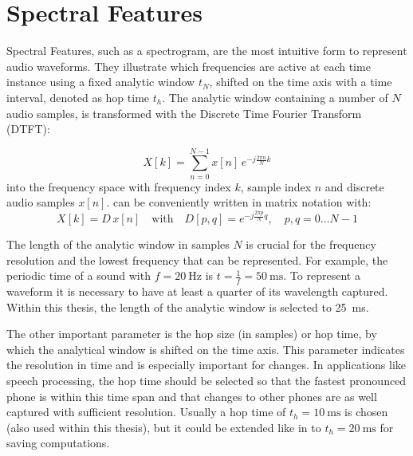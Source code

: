 
\section{Spectral Features}\label{sec:signal_spec}
Spectral Features, such as a spectrogram, are the most intuitive form to represent audio waveforms. 
They illustrate which frequencies are active at each time instance using a fixed analytic window $t_N$, shifted on the time axis with a time interval, denoted as hop time $t_{h}$.
The analytic window containing a number of $N$ audio samples, is transformed with the Discrete Time Fourier Transform (DTFT):

\begin{equation}\label{eq:signal_spec_dtft}
    X[k] = \sum_{n=0}^{N-1} x[n] \, e^{-j\frac{2 \pi n}{N}k}
\end{equation}
into the frequency space with frequency index $k$, sample index $n$ and discrete audio samples $x[n]$.
 can be conveniently written in matrix notation with:
\begin{equation}\label{eq:signal_spec_dtft_matrix}
    X[k] = D\, x[n] \quad \mathrm{with} 
    \quad D[p, q] = e^{-j\frac{2 \pi p}{N} q},
    \quad p, q = 0 \dots N-1
\end{equation}

The length of the analytic window in samples $N$ is crucial for the frequency resolution and the lowest frequency that can be represented.
For example, the periodic time of a sound with $f=\SI{20}{\hertz}$ is $t=\frac{1}{f} = \SI{50}{\milli\second}$.
To represent a waveform it is necessary to have at least a quarter of its wavelength captured.
Within this thesis, the length of the analytic window is selected to \SI{25}{\milli\second}.

The other important parameter is the hop size (in samples) or hop time, by which the analytical window is shifted on the time axis.
This parameter indicates the resolution in time and is especially important for changes.
In applications like speech processing, the hop time should be selected so that the fastest pronounced phone is within this time span and that changes to other phones are as well captured with sufficient resolution.
Usually a hop time of $t_{h}=\SI{10}{\milli\second}$ is chosen (also used within this thesis), but it could be extended like in \cite{Peter2020} to $t_{h}=\SI{20}{\milli\second}$ for saving computations.

